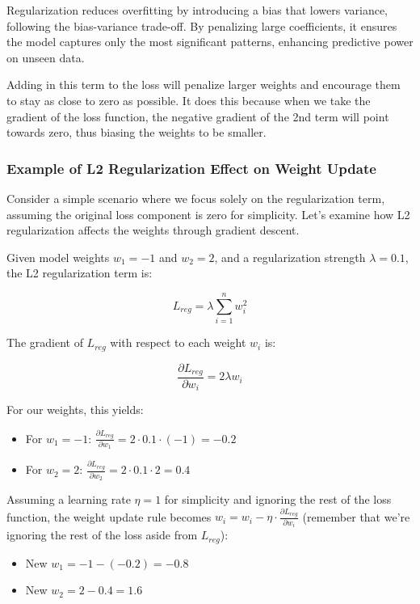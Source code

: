 \documentclass[12pt]{article}
\begin{document}
Regularization reduces overfitting by introducing a bias that lowers variance, following the bias-variance trade-off. By penalizing large coefficients, it ensures the model captures only the most significant patterns, enhancing predictive power on unseen data.

Adding in this term to the loss will penalize larger weights and encourage them to stay as close to zero as possible. It does this because when we take the gradient of the loss function, the negative gradient of the 2nd term will point towards zero, thus biasing the weights to be smaller.

\subsubsection{Example of L2 Regularization Effect on Weight Update}

Consider a simple scenario where we focus solely on the regularization term, assuming the original loss component is zero for simplicity. Let's examine how L2 regularization affects the weights through gradient descent.

Given model weights \(w_1 = -1\) and \(w_2 = 2\), and a regularization strength \(\lambda = 0.1\), the L2 regularization term is:

\[ L_{reg} = \lambda \sum_{i=1}^{n} w_i^2 \]

The gradient of \(L_{reg}\) with respect to each weight \(w_i\) is:

\[ \frac{\partial L_{reg}}{\partial w_i} = 2\lambda w_i \]

For our weights, this yields:

\begin{itemize}
    \item For \(w_1 = -1\): \(\frac{\partial L_{reg}}{\partial w_1} = 2 \cdot 0.1 \cdot (-1) = -0.2\)
    \item For \(w_2 = 2\): \(\frac{\partial L_{reg}}{\partial w_2} = 2 \cdot 0.1 \cdot 2 = 0.4\)
\end{itemize}

Assuming a learning rate \(\eta = 1\) for simplicity and ignoring the rest of the loss function, the weight update rule becomes \(w_i = w_i - \eta \cdot \frac{\partial L_{reg}}{\partial w_i}\) (remember that we're ignoring the rest of the loss aside from \(L_{reg}\)):

\begin{itemize}
    \item New \(w_1 = -1 - (-0.2) = -0.8\)
    \item New \(w_2 = 2 - 0.4 = 1.6\)
\end{itemize}
\end{document}
